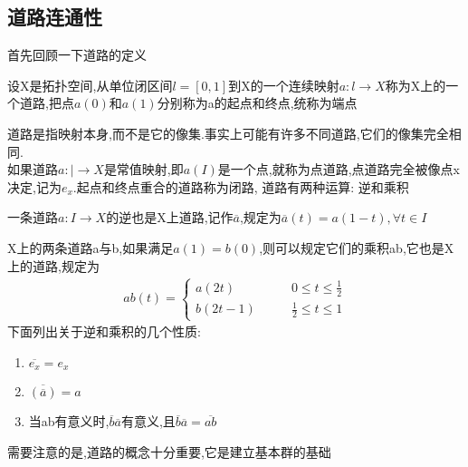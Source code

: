 \subsection*{道路连通性}
首先回顾一下道路的定义
\begin{definition}
    设X是拓扑空间,从单位闭区间\(l= [0,1]\)到X的一个连续映射\(a: l \rightarrow X\)称为X上的一个道路,把点\(a(0)\)和\(a(1)\)分别称为a的起点和终点,统称为端点 
\end{definition}
道路是指映射本身,而不是它的像集.事实上可能有许多不同道路,它们的像集完全相同.
\\
如果道路\(a : | \rightarrow X\)是常值映射,即\(a(I)\)是一个点,就称为点道路,点道路完全被像点x决定,记为\(e_x\).起点和终点重合的道路称为闭路,
道路有两种运算: 逆和乘积 
\begin{definition}
    一条道路\(a : I \rightarrow X \)的逆也是X上道路,记作\(\overline{a}\),规定为\(\overline{a}(t)=a(1-t),\forall t \in I\)
\end{definition}
X上的两条道路a与b,如果满足\(a(1) = b(0)\),则可以规定它们的乘积ab,它也是X上的道路,规定为
\begin{align}
    ab(t)= \begin{cases}
        a(2t) \qquad & 0 \leq t \leq \frac{1}{2} \\ 
        b(2t-1) \qquad & \frac{1}{2}\leq t \leq 1
    \end{cases}
\end{align}
下面列出关于逆和乘积的几个性质:
\begin{theorem}
    \begin{enumerate}
        \item \(\overline{e_x} = e_x\) \\
        \item \(\overline{(\overline{a})}=a\) \\
        \item 当ab有意义时,\(\overline{b}\overline{a}\)有意义,且\(\overline{b}\overline{a}=\overline{ab}\)
    \end{enumerate}
\end{theorem}
需要注意的是,道路的概念十分重要,它是建立基本群的基础
